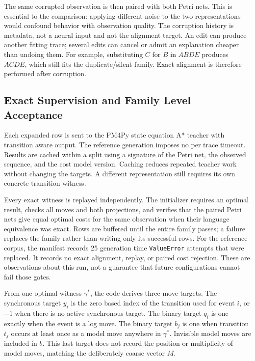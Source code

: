 The same corrupted observation is then paired with both Petri nets. This is essential to the comparison: applying different noise to the two representations would confound behavior with observation quality. The corruption history is metadata, not a neural input and not the alignment target. An edit can produce another fitting trace; several edits can cancel or admit an explanation cheaper than undoing them. For example, substituting $C$ for $B$ in $ABDE$ produces $ACDE$, which still fits the duplicate/silent family. Exact alignment is therefore performed after corruption.

\subsection{Exact Supervision and Family Level Acceptance}
\label{sec:teacher}

Each expanded row is sent to the PM4Py state equation A* teacher with transition aware output. The reference generation imposes no per trace timeout. Results are cached within a split using a signature of the Petri net, the observed sequence, and the cost model version. Caching reduces repeated teacher work without changing the targets. A different representation still requires its own concrete transition witness.

Every exact witness is replayed independently. The initializer requires an optimal result, checks all moves and both projections, and verifies that the paired Petri nets give equal optimal costs for the same observation when their language equivalence was exact. Rows are buffered until the entire family passes; a failure replaces the family rather than writing only its successful rows. For the reference corpus, the manifest records 25 generation time \texttt{ValueError} attempts that were replaced. It records no exact alignment, replay, or paired cost rejection. These are observations about this run, not a guarantee that future configurations cannot fail those gates.

From one optimal witness $\gamma^*$, the code derives three move targets. The synchronous target $y_i$ is the zero based index of the transition used for event $i$, or $-1$ when there is no active synchronous target. The binary target $q_i$ is one exactly when the event is a log move. The binary target $b_j$ is one when transition $t_j$ occurs at least once as a model move anywhere in $\gamma^*$. Invisible model moves are included in $b$. This last target does not record the position or multiplicity of model moves, matching the deliberately coarse vector $M$.

